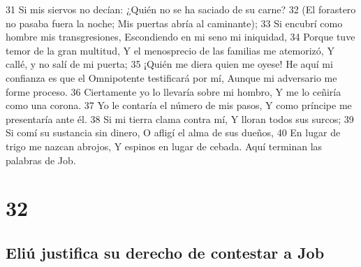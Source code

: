 31 Si mis siervos no decían:
¿Quién no se ha saciado de su carne?
32 (El forastero no pasaba fuera la noche;
Mis puertas abría al caminante);
33 Si encubrí como hombre mis transgresiones,
Escondiendo en mi seno mi iniquidad,
34 Porque tuve temor de la gran multitud,
Y el menosprecio de las familias me atemorizó,
Y callé, y no salí de mi puerta;
35 ¡Quién me diera quien me oyese!
He aquí mi confianza es que el Omnipotente testificará por mí,
Aunque mi adversario me forme proceso.
36 Ciertamente yo lo llevaría sobre mi hombro,
Y me lo ceñiría como una corona.
37 Yo le contaría el número de mis pasos,
Y como príncipe me presentaría ante él.
38 Si mi tierra clama contra mí,
Y lloran todos sus surcos;
39 Si comí su sustancia sin dinero,
O afligí el alma de sus dueños,
40 En lugar de trigo me nazcan abrojos,
Y espinos en lugar de cebada.
Aquí terminan las palabras de Job.

\chapter{32}

\section*{Eliú justifica su derecho de contestar a Job}

